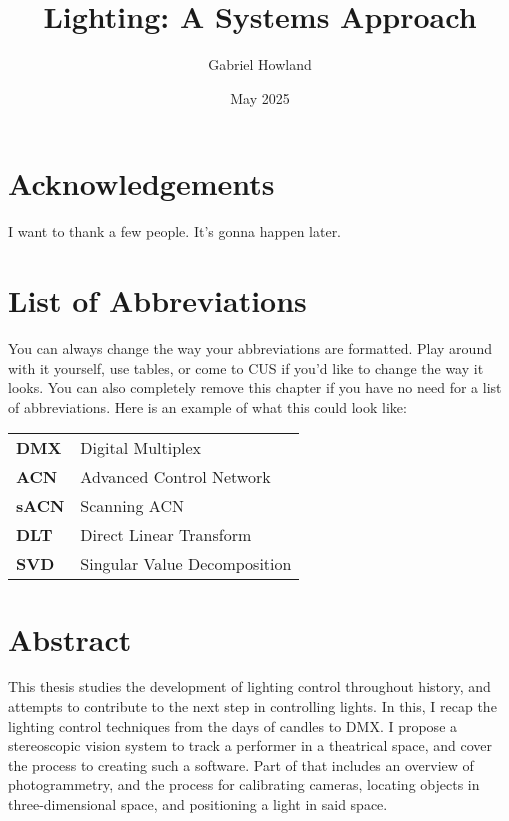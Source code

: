 \documentclass[
    12pt,
    twoside,
    bibstyle=chicago,
    headerstyle=uppercase,
	bibfile=biblatex_updating.bib
]{reedthesis}
\title{Lighting: A Systems Approach}
\author{Gabriel Howland}
\date{May 2025}
\begin{document}
  \maketitle
  \frontmatter %
  \pagestyle{empty} %

    \chapter*{Acknowledgements}
	I want to thank a few people. It's gonna happen later.

	

    \chapter*{List of Abbreviations}
		You can always change the way your abbreviations are formatted. Play around with it yourself, use tables, or come to CUS if you'd like to change the way it looks. You can also completely remove this chapter if you have no need for a list of abbreviations. Here is an example of what this could look like:

	\begin{table}[h]
	\centering %
	\begin{tabular}{ll}
		\textbf{DMX}  	&  Digital Multiplex \\
		\textbf{ACN}		&  Advanced Control Network\\
		\textbf{sACN}  	&  Scanning ACN\\
		\textbf{DLT} 	&  Direct Linear Transform\\
		\textbf{SVD}		&  Singular Value Decomposition\\
	\end{tabular}
	\end{table}
	

    \tableofcontents
    \listoffigures


    \chapter*{Abstract}
	This thesis studies the development of lighting control throughout history, and attempts to contribute to the next step in controlling lights. In this, I recap the lighting control techniques from the days of candles to DMX. I propose a stereoscopic vision system to track a performer in a theatrical space, and cover the process to creating such a software. Part of that includes an overview of photogrammetry, and the process for calibrating cameras, locating objects in three-dimensional space, and positioning a light in said space.
	
\end{document}
